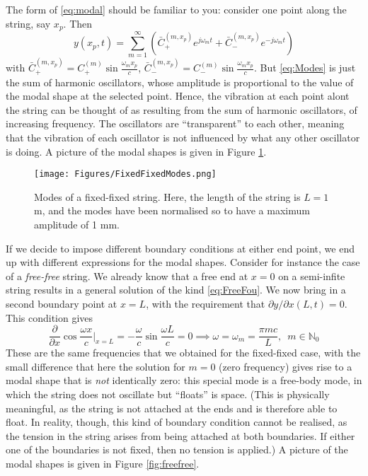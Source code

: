 \documentclass[11pt,twoside,a4paper,english]{book}
\begin{document}
\noindent
The form of \eqref{eq:modal} should be familiar to you: consider one point along the string, say $x_p$. Then
\begin{equation}\label{eq:Modes}
y(x_p,t) = \sum_{m=1}^{\infty } \left( \bar C_+^{(m,x_p)} e^{j \omega_m t} +  \bar C_-^{(m,x_p)}  e^{-j \omega_m t} \right)
\end{equation}
with $\bar C_+^{(m,x_p)} = C_+^{(m)} \sin \frac{\omega_m x_p}{c}$, $\bar C_-^{(m,x_p)} = C_-^{(m)} \sin \frac{\omega_m x_p}{c}$. But \eqref{eq:Modes} is just the sum of harmonic oscillators, whose amplitude is proportional to the value of the modal shape at the selected point. Hence, the vibration at each point alont the string can be thought of as resulting from the sum of harmonic oscillators, of increasing frequency. The oscillators are ``transparent'' to each other, meaning that the vibration of each oscillator is not influenced by what any other oscillator is doing. A picture of the modal shapes is given in Figure \ref{fig:fixfix}.
\begin{figure}[hbt]
\texttt{[image: Figures/FixedFixedModes.png]}
\caption{Modes of a fixed-fixed string. Here, the length of the string is $L =1$ m, and the modes have been normalised so to have a maximum amplitude of 1 mm.}\label{fig:fixfix}
\end{figure}

\medskip \medskip 

\noindent
If we decide to impose different boundary conditions at either end point, we end up with different expressions for the modal shapes. Consider for instance the case of a \emph{free-free} string. We already know that a free end at $x=0$ on a semi-infite string results in a general solution of the kind \eqref{eq:FreeFou}. We now bring in a second boundary point at $x=L$, with the requirement that $\partial y / \partial x (L,t) = 0$. This condition gives
\begin{equation}
\frac{\partial}{\partial x}\cos\frac{\omega x}{c}\Bigg|_{x=L} = - \frac{\omega}{c} \sin \frac{\omega L}{c} = 0 \implies \omega = \omega_m = \frac{\pi m c}{L}, \,\,\, m \in \mathbb{N}_0
\end{equation}
These are the same frequencies that we obtained for the fixed-fixed case, with the small difference that here the solution for $m=0$ (zero frequency) gives rise to a modal shape that is \emph{not} identically zero: this special mode is a free-body mode, in which the string does not oscillate but ``floats'' is space. (This is physically meaningful, as the string is not attached at the ends and is therefore able to float. In reality, though, this kind of boundary condition cannot be realised, as the tension in the string arises from being attached at both boundaries. If either one of the boundaries is not fixed, then no tension is applied.) A picture of the modal shapes is given in Figure \ref{fig:freefree}.
\end{document}

